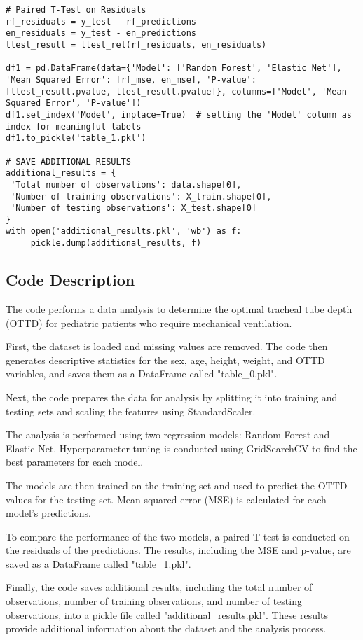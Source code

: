 \documentclass[11pt]{article}
\begin{document}
\begin{verbatim}
# Paired T-Test on Residuals
rf_residuals = y_test - rf_predictions
en_residuals = y_test - en_predictions
ttest_result = ttest_rel(rf_residuals, en_residuals)

df1 = pd.DataFrame(data={'Model': ['Random Forest', 'Elastic Net'], 'Mean Squared Error': [rf_mse, en_mse], 'P-value': [ttest_result.pvalue, ttest_result.pvalue]}, columns=['Model', 'Mean Squared Error', 'P-value'])
df1.set_index('Model', inplace=True)  # setting the 'Model' column as index for meaningful labels
df1.to_pickle('table_1.pkl')

# SAVE ADDITIONAL RESULTS
additional_results = {
 'Total number of observations': data.shape[0], 
 'Number of training observations': X_train.shape[0],
 'Number of testing observations': X_test.shape[0]
}
with open('additional_results.pkl', 'wb') as f:
     pickle.dump(additional_results, f)

\end{verbatim}

\subsection{Code Description}

The code performs a data analysis to determine the optimal tracheal tube depth (OTTD) for pediatric patients who require mechanical ventilation. 

First, the dataset is loaded and missing values are removed. The code then generates descriptive statistics for the sex, age, height, weight, and OTTD variables, and saves them as a DataFrame called "table\_0.pkl".

Next, the code prepares the data for analysis by splitting it into training and testing sets and scaling the features using StandardScaler. 

The analysis is performed using two regression models: Random Forest and Elastic Net. Hyperparameter tuning is conducted using GridSearchCV to find the best parameters for each model. 

The models are then trained on the training set and used to predict the OTTD values for the testing set. Mean squared error (MSE) is calculated for each model's predictions. 

To compare the performance of the two models, a paired T-test is conducted on the residuals of the predictions. The results, including the MSE and p-value, are saved as a DataFrame called "table\_1.pkl".

Finally, the code saves additional results, including the total number of observations, number of training observations, and number of testing observations, into a pickle file called "additional\_results.pkl". These results provide additional information about the dataset and the analysis process.
\end{document}
